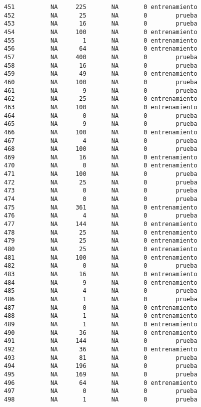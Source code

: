 \documentclass[
  letterpaper,
  DIV=11,
  numbers=noendperiod]{scrreprt}
\begin{document}
\begin{verbatim}
451          NA     225       NA       0 entrenamiento
452          NA      25       NA       0        prueba
453          NA      16       NA       0        prueba
454          NA     100       NA       0 entrenamiento
455          NA       1       NA       0 entrenamiento
456          NA      64       NA       0 entrenamiento
457          NA     400       NA       0        prueba
458          NA      16       NA       0        prueba
459          NA      49       NA       0 entrenamiento
460          NA     100       NA       0        prueba
461          NA       9       NA       0        prueba
462          NA      25       NA       0 entrenamiento
463          NA     100       NA       0 entrenamiento
464          NA       0       NA       0        prueba
465          NA       9       NA       0        prueba
466          NA     100       NA       0 entrenamiento
467          NA       4       NA       0        prueba
468          NA     100       NA       0        prueba
469          NA      16       NA       0 entrenamiento
470          NA       0       NA       0 entrenamiento
471          NA     100       NA       0        prueba
472          NA      25       NA       0        prueba
473          NA       0       NA       0        prueba
474          NA       0       NA       0        prueba
475          NA     361       NA       0 entrenamiento
476          NA       4       NA       0        prueba
477          NA     144       NA       0 entrenamiento
478          NA      25       NA       0 entrenamiento
479          NA      25       NA       0 entrenamiento
480          NA      25       NA       0 entrenamiento
481          NA     100       NA       0 entrenamiento
482          NA       0       NA       0        prueba
483          NA      16       NA       0 entrenamiento
484          NA       9       NA       0 entrenamiento
485          NA       4       NA       0        prueba
486          NA       1       NA       0        prueba
487          NA       0       NA       0 entrenamiento
488          NA       1       NA       0 entrenamiento
489          NA       1       NA       0 entrenamiento
490          NA      36       NA       0 entrenamiento
491          NA     144       NA       0        prueba
492          NA      36       NA       0 entrenamiento
493          NA      81       NA       0        prueba
494          NA     196       NA       0        prueba
495          NA     169       NA       0        prueba
496          NA      64       NA       0 entrenamiento
497          NA       0       NA       0        prueba
498          NA       1       NA       0        prueba

\end{verbatim}
\end{document}
